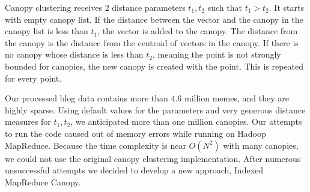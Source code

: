 \documentclass{sig-alternate}
\begin{document}
Canopy clustering receives 2 distance parameters $t_1, t_2$ such that $t_1 > t_2$. It starts with empty canopy list. If the distance between the vector and the canopy in the canopy list is less than $t_1$, the vector is added to the canopy. The distance from the canopy is the distance from the centroid of vectors in the canopy. If there is no canopy whose distance is less than $t_2$, meaning the point is not strongly bounded for canopies, the new canopy is created with the point. This is repeated for every point.

Our processed blog data contains more than 4.6 million memes, and they are highly sparse. Using default values for the parameters and very generous distance measures for $t_1,t_2$, we anticipated more than one million canopies. Our attempts to run the code caused out of memory errors while running on Hadoop MapReduce. Because the time complexity is near $O(N^2)$ with many canopies, we could not use the original canopy clustering implementation. After numerous unsuccessful attempts we decided to develop a new approach, Indexed MapReduce Canopy.
\end{document}
